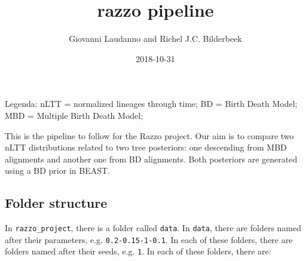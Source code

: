 \documentclass[]{article}
\title{razzo pipeline}
\author{Giovanni Laudanno and Richel J.C. Bilderbeek}
\date{2018-10-31}
\begin{document}
\maketitle

Legenda: nLTT = normalized lineages through time; BD = Birth Death
Model; MBD = Multiple Birth Death Model;

This is the pipeline to follow for the Razzo project. Our aim is to
compare two nLTT distributions related to two tree posteriors: one
descending from MBD alignments and another one from BD alignments. Both
posteriors are generated using a BD prior in BEAST.

\subsection{Folder structure}\label{folder-structure}

In \texttt{razzo\_project}, there is a folder called \texttt{data}. In
\texttt{data}, there are folders named after their parameters, e.g.
\texttt{0.2-0.15-1-0.1}. In each of these folders, there are folders
named after their seeds, e.g. \texttt{1}. In each of these folders,
there are:
\end{document}
